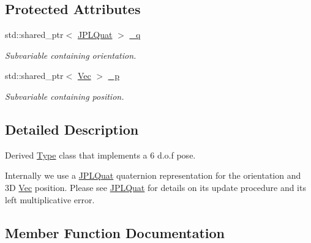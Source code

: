 \subsection*{Protected Attributes}
\begin{DoxyCompactItemize}
\item 
\mbox{\label{classov__type_1_1PoseJPL_a945324efa203146186f18faa7fb83bdb}} 
std\+::shared\+\_\+ptr$<$ \hyperlink{classov__type_1_1JPLQuat}{J\+P\+L\+Quat} $>$ \hyperlink{classov__type_1_1PoseJPL_a945324efa203146186f18faa7fb83bdb}{\+\_\+q}
\begin{DoxyCompactList}\small\item\em Subvariable containing orientation. \end{DoxyCompactList}\item 
\mbox{\label{classov__type_1_1PoseJPL_aa5054d412515696961240ca29586ce16}} 
std\+::shared\+\_\+ptr$<$ \hyperlink{classov__type_1_1Vec}{Vec} $>$ \hyperlink{classov__type_1_1PoseJPL_aa5054d412515696961240ca29586ce16}{\+\_\+p}
\begin{DoxyCompactList}\small\item\em Subvariable containing position. \end{DoxyCompactList}\end{DoxyCompactItemize}


\subsection{Detailed Description}
Derived \hyperlink{classov__type_1_1Type}{Type} class that implements a 6 d.\+o.\+f pose. 

Internally we use a \hyperlink{classov__type_1_1JPLQuat}{J\+P\+L\+Quat} quaternion representation for the orientation and 3D \hyperlink{classov__type_1_1Vec}{Vec} position. Please see \hyperlink{classov__type_1_1JPLQuat}{J\+P\+L\+Quat} for details on its update procedure and its left multiplicative error. 

\subsection{Member Function Documentation}
\mbox{\label{classov__type_1_1PoseJPL_aa2138dce0eef761ebbeacc0136da34cc}} 
